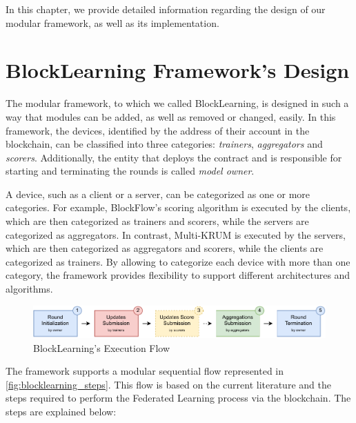 In this chapter, we provide detailed information regarding the design of our modular framework, as well as its implementation.

\section{BlockLearning Framework's Design}\label{framework:design}

The modular framework, to which we called BlockLearning, is designed in such a way that modules can be added, as well as removed or changed, easily. In this framework, the devices, identified by the address of their account in the blockchain, can be classified into three categories: \textit{trainers}, \textit{aggregators} and \textit{scorers}. Additionally, the entity that deploys the contract and is responsible for starting and terminating the rounds is called \textit{model owner}.

A device, such as a client or a server, can be categorized as one or more categories. For example, BlockFlow's scoring algorithm is executed by the clients, which are then categorized as trainers and scorers, while the servers are categorized as aggregators. In contrast, Multi-KRUM is executed by the servers, which are then categorized as aggregators and scorers, while the clients are categorized as trainers. By allowing to categorize each device with more than one category, the framework provides flexibility to support different architectures and algorithms.

\begin{figure}[!ht]
    \centering
    \includegraphics[width=1\textwidth]{graphics/sequence.pdf}
    \caption{BlockLearning's Execution Flow}
    \label{fig:blocklearning_steps}
\end{figure}

The framework supports a modular sequential flow represented in \autoref{fig:blocklearning_steps}. This flow is based on the current literature and the steps required to perform the Federated Learning process via the blockchain. The steps are explained below:

